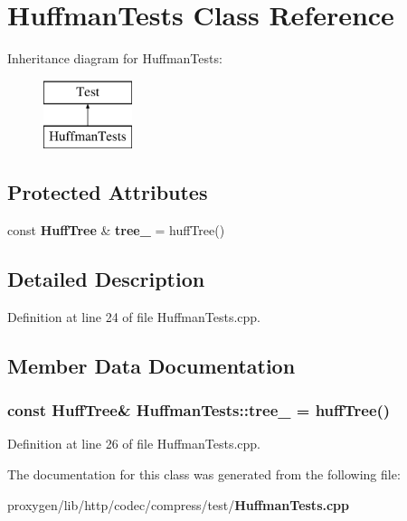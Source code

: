 \section{Huffman\+Tests Class Reference}
\label{classHuffmanTests}
Inheritance diagram for Huffman\+Tests\+:\begin{figure}[H]
\begin{center}
\leavevmode
\includegraphics[height=2.000000cm]{classHuffmanTests}
\end{center}
\end{figure}
\subsection*{Protected Attributes}
\begin{DoxyCompactItemize}
\item 
const {\bf Huff\+Tree} \& {\bf tree\+\_\+} = huff\+Tree()
\end{DoxyCompactItemize}


\subsection{Detailed Description}


Definition at line 24 of file Huffman\+Tests.\+cpp.



\subsection{Member Data Documentation}
\subsubsection[{tree\+\_\+}]{\setlength{\rightskip}{0pt plus 5cm}const {\bf Huff\+Tree}\& Huffman\+Tests\+::tree\+\_\+ = huff\+Tree()\hspace{0.3cm}{\ttfamily [protected]}}\label{classHuffmanTests_ad5332410750dfb03b1c61c15615a9d2c}


Definition at line 26 of file Huffman\+Tests.\+cpp.



The documentation for this class was generated from the following file\+:\begin{DoxyCompactItemize}
\item 
proxygen/lib/http/codec/compress/test/{\bf Huffman\+Tests.\+cpp}\end{DoxyCompactItemize}
